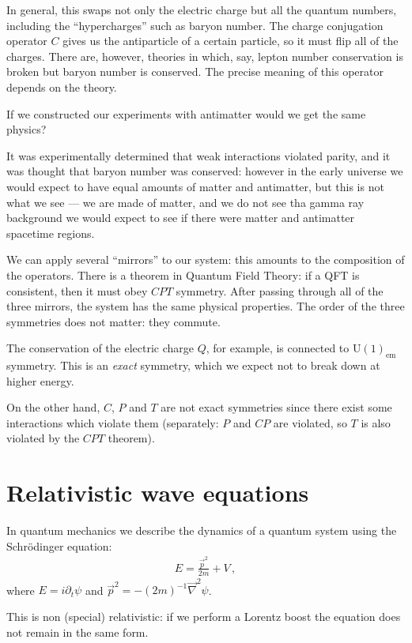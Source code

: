 \documentclass[main.tex]{subfiles}
\begin{document}
In general, this swaps not only the electric charge but all the quantum numbers, including the ``hypercharges'' such as baryon number.
The charge conjugation operator \(C\) gives us the antiparticle of a certain particle, so it must flip all of the charges. 
There are, however, theories in which, say, lepton number conservation is broken but baryon number is conserved. The precise meaning of this operator depends on the theory. 

If we constructed our experiments with antimatter would we get the same physics? 

It was experimentally determined that weak interactions violated parity, and it was thought that baryon number was conserved: however in the early universe we would expect to have equal amounts of matter and antimatter, but this is not what we see --- we are made of matter, and we do not see tha gamma ray background we would expect to see if there were matter and antimatter spacetime regions. 

We can apply several ``mirrors'' to our system: this amounts to the composition of the operators. 
There is a theorem in Quantum Field Theory: if a QFT is consistent, then it must obey \(CPT\) symmetry. 
After passing through all of the three mirrors, the system has the same physical properties. 
The order of the three symmetries does not matter: they commute. 

The conservation of the electric charge \(Q\), for example, is connected to \(\mathrm{U}(1)_{\text{em}}\) symmetry. 
This is an \emph{exact} symmetry, which we expect not to break down at higher energy. 

On the other hand, \(C\), \(P\) and \(T\) are not exact symmetries since there exist some interactions which violate them (separately: \(P\) and \(CP\) are violated, so \(T\) is also violated by the \(CPT\) theorem). 

\section{Relativistic wave equations}

In quantum mechanics we describe the dynamics of a quantum system using the Schrödinger equation: 
%
\begin{align}
E = \frac{\vec{p}^2}{2m } + V
\,,
\end{align}
%
where \(E = i \partial_{t} \psi \) and \(\vec{p}^2 = - (2m)^{-1} \vec{\nabla}^2 \psi \). 

This is non (special) relativistic: if we perform a Lorentz boost the equation does not remain in the same form. 
\end{document}
